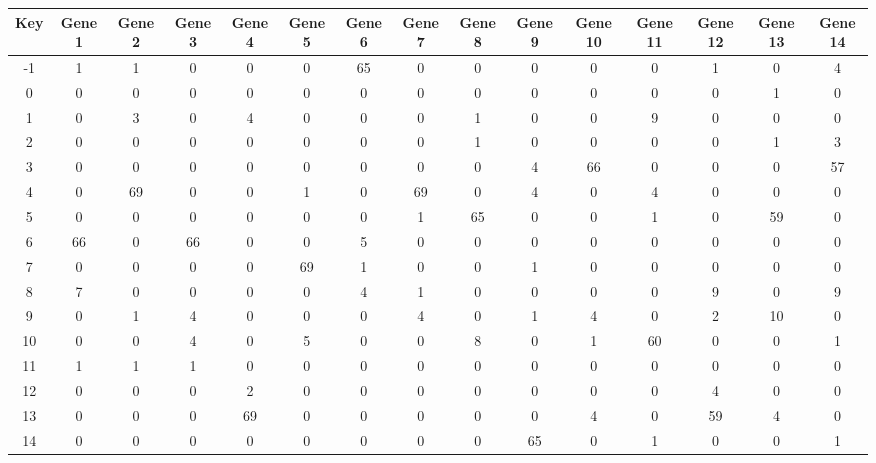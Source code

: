 \begin{tabular}{|c|c|c|c|c|c|c|c|c|c|c|c|c|c|c|}
\hline
Key & Gene 1 & Gene 2 & Gene 3 & Gene 4 & Gene 5 & Gene 6 & Gene 7 & Gene 8 & Gene 9 & Gene 10 & Gene 11 & Gene 12 & Gene 13 & Gene 14 \\
\hline
-1 & 1 & 1 & 0 & 0 & 0 & 65 & 0 & 0 & 0 & 0 & 0 & 1 & 0 & 4 \\
0 & 0 & 0 & 0 & 0 & 0 & 0 & 0 & 0 & 0 & 0 & 0 & 0 & 1 & 0 \\
1 & 0 & 3 & 0 & 4 & 0 & 0 & 0 & 1 & 0 & 0 & 9 & 0 & 0 & 0 \\
2 & 0 & 0 & 0 & 0 & 0 & 0 & 0 & 1 & 0 & 0 & 0 & 0 & 1 & 3 \\
3 & 0 & 0 & 0 & 0 & 0 & 0 & 0 & 0 & 4 & 66 & 0 & 0 & 0 & 57 \\
4 & 0 & 69 & 0 & 0 & 1 & 0 & 69 & 0 & 4 & 0 & 4 & 0 & 0 & 0 \\
5 & 0 & 0 & 0 & 0 & 0 & 0 & 1 & 65 & 0 & 0 & 1 & 0 & 59 & 0 \\
6 & 66 & 0 & 66 & 0 & 0 & 5 & 0 & 0 & 0 & 0 & 0 & 0 & 0 & 0 \\
7 & 0 & 0 & 0 & 0 & 69 & 1 & 0 & 0 & 1 & 0 & 0 & 0 & 0 & 0 \\
8 & 7 & 0 & 0 & 0 & 0 & 4 & 1 & 0 & 0 & 0 & 0 & 9 & 0 & 9 \\
9 & 0 & 1 & 4 & 0 & 0 & 0 & 4 & 0 & 1 & 4 & 0 & 2 & 10 & 0 \\
10 & 0 & 0 & 4 & 0 & 5 & 0 & 0 & 8 & 0 & 1 & 60 & 0 & 0 & 1 \\
11 & 1 & 1 & 1 & 0 & 0 & 0 & 0 & 0 & 0 & 0 & 0 & 0 & 0 & 0 \\
12 & 0 & 0 & 0 & 2 & 0 & 0 & 0 & 0 & 0 & 0 & 0 & 4 & 0 & 0 \\
13 & 0 & 0 & 0 & 69 & 0 & 0 & 0 & 0 & 0 & 4 & 0 & 59 & 4 & 0 \\
14 & 0 & 0 & 0 & 0 & 0 & 0 & 0 & 0 & 65 & 0 & 1 & 0 & 0 & 1 \\
\hline
\end{tabular}